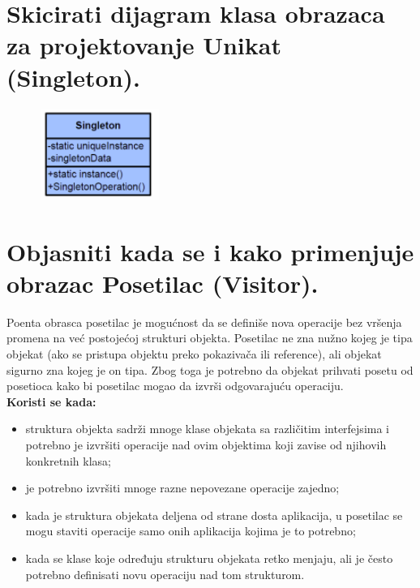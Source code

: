 \documentclass[a4paper]{article}
\begin{document}
\section{Skicirati dijagram klasa obrazaca za projektovanje Unikat (Singleton).}
  \begin{figure}[H]
    \begin{center}
        \includegraphics[width=40mm,height=30mm]{Slike/dp_singleton.png}
    \end{center}
  \end{figure}  

\section{Objasniti kada se i kako primenjuje obrazac Posetilac (Visitor).}
  Poenta obrasca posetilac je mogućnost da se definiše nova operacije bez vršenja promena na
  već postojećoj strukturi objekta. Posetilac ne zna nužno kojeg je tipa objekat (ako se 
  pristupa objektu preko pokazivača ili reference), ali objekat sigurno zna kojeg je on tipa. Zbog toga je potrebno
  da objekat prihvati posetu od posetioca kako bi posetilac mogao da izvrši odgovarajuću operaciju.\\
  \textbf{Koristi se kada:}
  \begin{itemize}
    \item struktura objekta sadrži mnoge klase objekata sa različitim interfejsima i potrebno 
          je izvršiti operacije nad ovim objektima koji zavise od njihovih konkretnih klasa;
    \item je potrebno izvršiti mnoge razne nepovezane operacije zajedno;
    \item kada je struktura objekata deljena od strane dosta aplikacija, u posetilac se mogu
          staviti operacije samo onih aplikacija kojima je to potrebno;
    \item kada se klase koje određuju strukturu objekata retko menjaju, ali je često potrebno
          definisati novu operaciju nad tom strukturom.
  \end{itemize}
\end{document}
